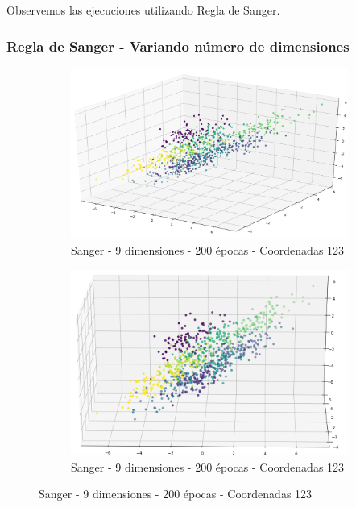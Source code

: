 Observemos las ejecuciones utilizando Regla de Sanger.

\subsubsection{Regla de Sanger - Variando número de dimensiones}

\begin{figure}[!htbp]
\centering
\begin{subfigure}{.5\textwidth}
  \centering
  \includegraphics[width=1\linewidth, scale=1]{../img/ej1/sanger_corrida_200_9/sanger_9salida_200ep_testing_dim123.png}
  \caption{Sanger - 9 dimensiones - 200 épocas - Coordenadas 123}
  \label{fig:sub1}
\end{subfigure}%
\begin{subfigure}{.5\textwidth}
  \centering
  \includegraphics[width=1\linewidth, scale=1]{../img/ej1/sanger_corrida_200_9/sanger_9salida_200ep_testing_dim123_2.png}
  \caption{Sanger - 9 dimensiones - 200 épocas - Coordenadas 123}
  \label{fig:sub2}
\end{subfigure}
\end{figure}

